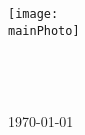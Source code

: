 \begin{titlepage} 
	
	\center %
	
	\texttt{[image: \\mainPhoto]}\\[1.7cm]
	
	
	\HRule\\[0.65cm]
	
	{\huge\bfseries \documentTitle}\\[0.3cm]
	
	\HRule\\[1.7cm]
	
	\titlepageAuthors
	
	\vfill %
	{\large\today} 
	
	
	\vfill %
	
\end{titlepage}